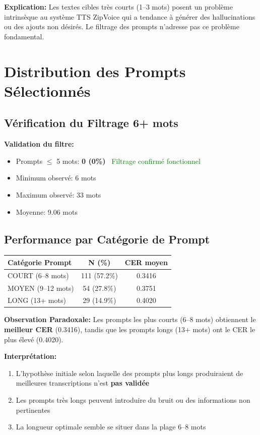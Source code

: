 \documentclass[12pt,a4paper]{article}
\begin{document}
\textbf{Explication:} Les textes cibles très courts (1--3 mots) posent un problème intrinsèque au système TTS ZipVoice qui a tendance à générer des hallucinations ou des ajouts non désirés. Le filtrage des prompts n'adresse pas ce problème fondamental.

\section{Distribution des Prompts Sélectionnés}

\subsection{Vérification du Filtrage 6+ mots}

\textbf{Validation du filtre:}
\begin{itemize}
    \item Prompts $\leq$ 5 mots: \textbf{0 (0\%)} \checkmark \, \textcolor{green}{Filtrage confirmé fonctionnel}
    \item Minimum observé: 6 mots
    \item Maximum observé: 33 mots
    \item Moyenne: 9.06 mots
\end{itemize}

\subsection{Performance par Catégorie de Prompt}

\begin{center}
\begin{tabular}{|l|c|c|}
\hline
\textbf{Catégorie Prompt} & \textbf{N (\%)} & \textbf{CER moyen} \\
\hline
COURT (6--8 mots) & 111 (57.2\%) & 0.3416 \\
MOYEN (9--12 mots) & 54 (27.8\%) & 0.3751 \\
LONG (13+ mots) & 29 (14.9\%) & 0.4020 \\
\hline
\end{tabular}
\end{center}

\textbf{Observation Paradoxale:} Les prompts les plus courts (6--8 mots) obtiennent le \textbf{meilleur CER} (0.3416), tandis que les prompts longs (13+ mots) ont le CER le plus élevé (0.4020).

\textbf{Interprétation:}
\begin{enumerate}
    \item L'hypothèse initiale selon laquelle des prompts plus longs produiraient de meilleures transcriptions n'est \textbf{pas validée}
    \item Les prompts très longs peuvent introduire du bruit ou des informations non pertinentes
    \item La longueur optimale semble se situer dans la plage 6--8 mots
\end{enumerate}
\end{document}
